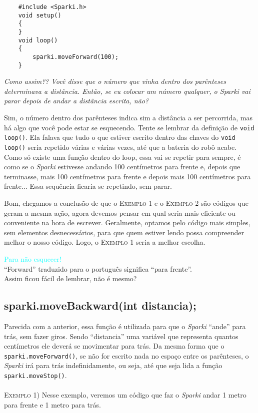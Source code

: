    \begin{verbatim}
    #include <Sparki.h>
    void setup()
    {
    }
    void loop()
    {
        sparki.moveForward(100);
    }
    \end{verbatim}
    
    \textit{Como assim?? Você disse que o número que vinha dentro dos parênteses determinava a distância. Então, se eu colocar um número qualquer, o \textsl{Sparki} vai parar depois de andar a distância escrita, não?} 
    
    Sim, o número dentro dos parênteses indica sim a distância a ser percorrida, mas há algo que você pode estar se esquecendo. Tente se lembrar da definição de \texttt{void loop()}. Ela falava que tudo o que estiver escrito dentro das chaves do \texttt{void loop()} seria repetido várias e várias vezes, até que a bateria do robô acabe. Como só existe uma função dentro do loop, essa vai se repetir para sempre, é como se o \textsl{Sparki} estivesse andando 100 centímetros para frente e, depois que terminasse, mais 100 centímetros para frente e depois mais 100 centímetros para frente... Essa sequência ficaria se repetindo, sem parar.
    
    Bom, chegamos a conclusão de que o \textsc{Exemplo 1} e o \textsc{Exemplo 2} são códigos que geram a mesma ação, agora devemos pensar em qual seria mais eficiente ou conveniente na hora de escrever. Geralmente, optamos pelo código mais simples, sem elementos desnecessários, para que quem estiver lendo possa compreender melhor o nosso código. Logo, o \textsc{Exemplo 1} seria a melhor escolha.
    
    \begin{center}
    \textcolor{cyan}{Para não esquecer!} \\``Forward'' traduzido para o português significa ``para frente''. 
    \\Assim ficou fácil de lembrar, não é mesmo?
    \end{center}

\subsection{sparki.moveBackward(int distancia);}
    Parecida com a anterior, essa função é utilizada para que o \textsl{Sparki} ``ande'' para trás, sem fazer giros. Sendo ``distancia'' uma variável que representa quantos centímetros ele deverá se movimentar para trás. Da mesma forma que o \texttt{sparki.moveForward()}, se não for escrito nada no espaço entre os parênteses, o \textsl{Sparki} irá para trás indefinidamente, ou seja, até que seja lida a função \texttt{sparki.moveStop()}.
    \\
    \\
    \textsc{Exemplo 1)} Nesse exemplo, veremos um código que faz o \textsl{Sparki} andar 1 metro para frente e 1 metro para trás.
    

